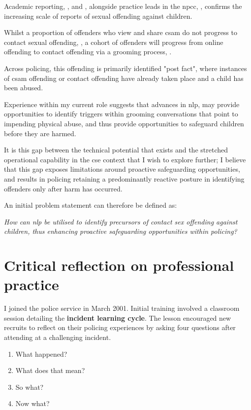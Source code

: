 \documentclass[12pt,a4paper,oneside]{report}
\begin{document}
Academic reporting, \citep{choi2024digital}, and \citep{finkelhor2024prevalence}, alongside practice leads in the \gls{npcc}, \citep{CPAI2025}, confirms the increasing scale of reports of sexual offending against children.

Whilst a proportion of offenders who view and share \gls{csam} do not progress to contact sexual offending, \citep{krone2017trajectories}, a cohort of offenders will progress from online offending to contact offending via a grooming process, \citep{soldino2024criminological}.  

Across policing, this offending is primarily identified "post fact", where instances of \gls{csam} offending or contact offending have already taken place and a child has been abused.

Experience within my current role suggests that advances in \gls{nlp}, may provide opportunities to identify triggers within grooming conversations that point to impending physical abuse, and thus provide opportunities to safeguard children before they are harmed.

It is this gap between the technical potential that exists and the stretched operational capability in the \gls{cse} context that I wish to explore further; I believe that this gap exposes limitations around proactive safeguarding opportunities, and results in policing retaining a predominantly reactive posture in identifying offenders only after harm has occurred.  

An initial problem statement can therefore be defined as:

\textit{How can \gls{nlp} be utilised to identify precursors of contact sex offending against children, thus enhancing proactive safeguarding opportunities within policing?}

\chapter{Critical reflection on professional practice}  
\label{ch:critical-reflection-on-professional-practice}
I joined the police service in March 2001.  Initial training involved a classroom session detailing the \textbf{incident learning cycle}.  The lesson encouraged new recruits to reflect on their policing experiences by asking four questions after attending at a challenging incident.

\begin{enumerate}
    \item What happened?
    \item What does that mean?
    \item So what?
    \item Now what?
\end{enumerate}
\end{document}
